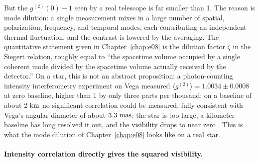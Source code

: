 But the \(g^{(2)}(0)-1\) seen by a real telescope is far smaller than 1. The reason is mode dilution: a single measurement mixes in a large number of spatial, polarization, frequency, and temporal modes, each contributing an independent thermal fluctuation, and the contrast is lowered by the averaging. The quantitative statement given in Chapter~\ref{chap:e08} is the dilution factor \(\zeta\) in the Siegert relation, roughly equal to ``the spacetime volume occupied by a single coherent mode divided by the spacetime volume actually received by the detector.'' On a star, this is not an abstract proposition: a photon-counting intensity interferometry experiment on Vega measured \(\langle g^{(2)}\rangle=1.0034\pm0.0008\) at zero baseline, higher than 1 by only three parts per thousand; on a baseline of about \(2~{\rm km}\) no significant correlation could be measured, fully consistent with Vega's angular diameter of about \(3.3~{\rm mas}\): the star is too large, a kilometer baseline has long resolved it out, and the visibility drops to near zero \citep{2021MNRAS.506.1585Z}. This is what the mode dilution of Chapter~\ref{chap:e08} looks like on a real star.

\paragraph{Intensity correlation directly gives the squared visibility.}
\label{sec:e17-g2-vis}


